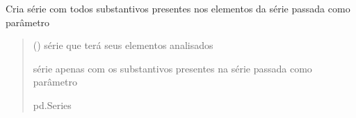 \documentclass[letterpaper,10pt,english]{sphinxmanual}
\begin{document}

\begin{fulllineitems}
\label{\detokenize{index:functions.nouns}}
\pysigstartsignatures
{}
\pysigstopsignatures
\sphinxAtStartPar
Cria série com todos substantivos presentes nos elementos da série passada como parâmetro
\begin{quote}\begin{description}
\sphinxAtStartPar
{} () \textendash{} série que terá seus elementos analisados

\sphinxAtStartPar
série apenas com os substantivos presentes na série passada como parâmetro

\sphinxAtStartPar
pd.Series

\end{description}\end{quote}

\end{fulllineitems}

\end{document}
